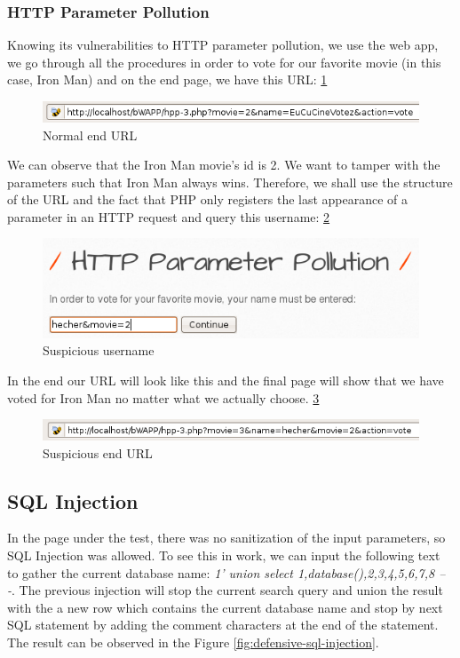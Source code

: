 \documentclass{article}
\begin{document}
\subsubsection{HTTP Parameter Pollution}
\label{section:http-parameter-pollution-exploit}
Knowing its vulnerabilities to HTTP parameter pollution, we use the web app, we go through all the procedures in order to vote for our favorite movie (in this case, Iron Man) and on the end page, we have this URL: \ref{fig:httpattack-1}
\begin{figure}
    \centering
    \includegraphics[width=1\linewidth]{Figures/httppp/http-attack1.png}
    \caption{\label{fig:httpattack-1}Normal end URL}
\end{figure}
We can observe that the Iron Man movie’s id is 2. We want to tamper with the parameters such that Iron Man always wins. Therefore, we shall use the structure of the URL and the fact that PHP only registers the last appearance of a parameter in an HTTP request and query this username: \ref{fig:httpattack-2}
\begin{figure}
    \centering
    \includegraphics[width=1\linewidth]{Figures/httppp/http-attack2.png}
    \caption{\label{fig:httpattack-2}Suspicious username}
\end{figure}
In the end our URL will look like this and the final page will show that we have voted for Iron Man no matter what we actually choose. \ref{fig:httpattack-3}
\begin{figure}
    \centering
    \includegraphics[width=1\linewidth]{Figures/httppp/http-attack3.png}
    \caption{\label{fig:httpattack-3}Suspicious end URL}
\end{figure}

\subsection{SQL Injection}
In the page under the test, there was no sanitization of the input parameters, so SQL Injection was allowed. To see this in work, we can input the following text to gather the current database name: \textit{1' union select 1,database(),2,3,4,5,6,7,8 -- -}. The previous injection will stop the current search query and union the result with the a new row which contains the current database name and stop by next SQL statement by adding the comment characters at the end of the statement. The result can be observed in the Figure \ref{fig:defensive-sql-injection}.
\end{document}
